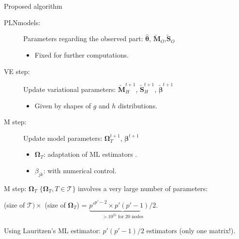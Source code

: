\documentclass[11pt]{beamer}
\newcommand{\betabft}{{\widetilde{\betabf}}}
\newcommand\betab{{\boldsymbol{\beta}}}
\newcommand\thetab{{\boldsymbol{\theta}}}
\newcommand\Omegab{{\boldsymbol{\Omega}}}
\newcommand\Mb{{\boldsymbol{M}}}
\newcommand{\betabf}{{\boldsymbol{\beta}}}
\newcommand{\Sbf}{{\boldsymbol{S}}}
\newcommand{\emphase}[1]{\textcolor{Complement}{#1}}
\begin{document}
\begin{frame}{Proposed algorithm}
\begin{description}
\item[PLNmodels: ] Parameters regarding the observed part: $\widehat{\thetab}$, $\widetilde{\Mb}_O$,$\widetilde{\Sbf}_O$\\
\begin{itemize}
\item Fixed for further computations.
\end{itemize}\vspace{0.5cm}
\item[VE step: ] Update variational parameters: $\widetilde{\Mb}_H^{t+1}$, $\widetilde{\Sbf}_H^{t+1}$, $\betabft^{t+1}$\\
\begin{itemize}
\item Given by shapes of $g$ and $h$ distributions.
\end{itemize}\vspace{0.5cm}

\item[M step: ] Update model parameters: $\Omegab_T^{t+1}$, $\betab^{t+1}$\\
\begin{itemize}
\item $\Omegab_T$: adaptation of ML estimators \citep{Lau96}.
\item $\beta_{jk}$: \citet{kirshner,MeilaJaak} with numerical control.
\end{itemize}
\end{description}
 \end{frame}
\begin{frame}{M step: $\Omegab_T$}
$\{\Omegab_T, T\in\mathcal{T}\}$ involves a very large number of parameters:\\
\bigskip
\begin{center}
(size of $\mathcal{T}) \times$ (size of $\Omegab_T$) = $\underbrace{p'^{p'-2}\times p'(p'-1)/2}_{>10^{25} \text{ for 20 nodes}}$.
\end{center}
\bigskip

Using Lauritzen's ML estimator: \emphase{$p'(p'-1)/2$ estimators} (only one matrix!).
\end{frame}
\end{document}
